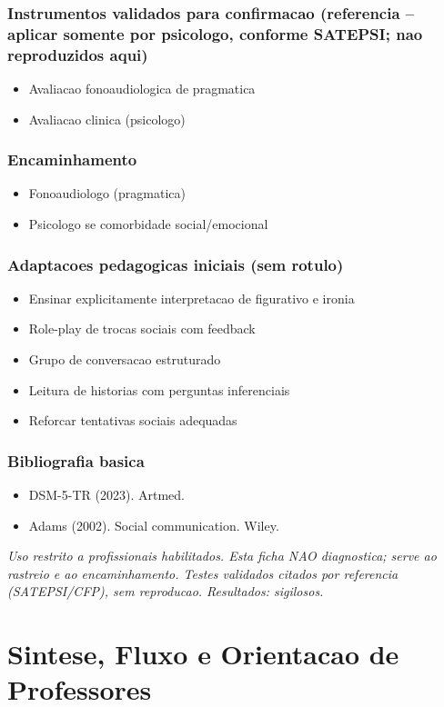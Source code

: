\documentclass[a4paper,11pt]{book}
\newcommand{\avisolegal}{\par\medskip\noindent\footnotesize\itshape
\color{cinza}Uso restrito a profissionais habilitados. Esta ficha NAO diagnostica;
serve ao rastreio e ao encaminhamento. Testes validados citados por referencia
(SATEPSI/CFP), sem reproducao. Resultados: sigilosos.\color{black}\par}
\begin{document}
\subsection*{Instrumentos validados para confirmacao (referencia -- aplicar somente por psicologo, conforme SATEPSI; nao reproduzidos aqui)}
\begin{itemize}
\item Avaliacao fonoaudiologica de pragmatica
\item Avaliacao clinica (psicologo)
\end{itemize}
\subsection*{Encaminhamento}
\begin{itemize}
\item Fonoaudiologo (pragmatica)
\item Psicologo se comorbidade social/emocional
\end{itemize}
\subsection*{Adaptacoes pedagogicas iniciais (sem rotulo)}
\begin{itemize}
\item Ensinar explicitamente interpretacao de figurativo e ironia
\item Role-play de trocas sociais com feedback
\item Grupo de conversacao estruturado
\item Leitura de historias com perguntas inferenciais
\item Reforcar tentativas sociais adequadas
\end{itemize}
\subsection*{Bibliografia basica}
\begin{itemize}
\item DSM-5-TR (2023). Artmed.
\item Adams (2002). Social communication. Wiley.
\end{itemize}
\avisolegal



\chapter{Sintese, Fluxo e Orientacao de Professores}
\end{document}
